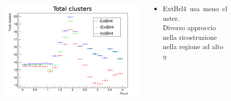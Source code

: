 \documentclass{beamer}
\begin{document}
\begin{frame}
\begin{columns}
\begin{column}{0.09\textwidth}
\end{column}
\begin{column}{0.41\textwidth}
\includegraphics[width=\textwidth]{Tracking/nSiHits_abseta2}
\end{column}
\begin{column}{0.41\textwidth}
\begin{itemize}
\item \small \mbox{ExtBrl4 usa meno cluster.} \\
Diverso approccio nella ricostruzione nella regione ad alto $\eta$
\end{itemize}
\end{column}
\begin{column}{0.09\textwidth}
\end{column}
\end{columns}

\end{frame}

\end{document}
